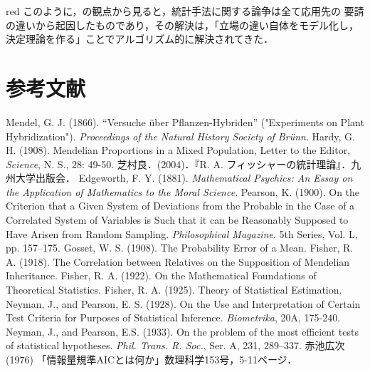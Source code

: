 \documentclass[uplatex,dvipdfmx]{jsreport}
\begin{document}
\begin{tbox}{red}{}
    このように，\cite{Fisher}の観点から見ると，統計手法に関する論争は全て応用先の
    要請の違いから起因したものであり，その解決は，「立場の違い自体をモデル化し，決定理論を作る」ことでアルゴリズム的に解決されてきた．

\end{tbox}

\chapter{参考文献}

\begin{thebibliography}{99}
    Mendel, G. J. (1866). “Versuche über Pflanzen-Hybriden” ("Experiments on Plant Hybridization"). \textit{Proceedings of the Natural History Society of Brünn}.
    Hardy, G. H. (1908). Mendelian Proportions in a Mixed Population, Letter to the Editor, \textit{Science}, N. S., 28: 49-50.
    芝村良．(2004)．『R. A. フィッシャーの統計理論』．九州大学出版会．
    Edgeworth, F. Y. (1881). \textit{Mathematical Psychics: An Essay on the Application of Mathematics to the Moral Science}.
    Pearson, K. (1900). On the Criterion that a Given System of Deviations from the Probable in the Case of a Correlated System of Variables is Such that it can be Reasonably Supposed to Have Arisen from Random Sampling. \textit{Philosophical Magazine}. 5th Series, Vol. L, pp. 157–175.
    Gosset, W. S. (1908). The Probability Error of a Mean.
    Fisher, R. A. (1918). The Correlation between Relatives on the Supposition of Mendelian Inheritance.
    Fisher, R. A. (1922). On the Mathematical Foundations of Theoretical Statistics.
    Fisher, R. A. (1925). Theory of Statistical Estimation.
    Neyman, J., and Pearson, E. S. (1928). On the Use and Interpretation of Certain Test Criteria for Purposes of Statistical Inference. \textit{Biometrika}, 20A, 175-240.
    Neyman, J., and Pearson, E.S. (1933). On the problem of the most efficient tests of statistical hypotheses. \textit{Phil. Trans. R. Soc.}, Ser. A, 231, 289–337.
    赤池広次 (1976) 「情報量規準AICとは何か」数理科学153号，5-11ページ．
\end{thebibliography}
\end{document}
